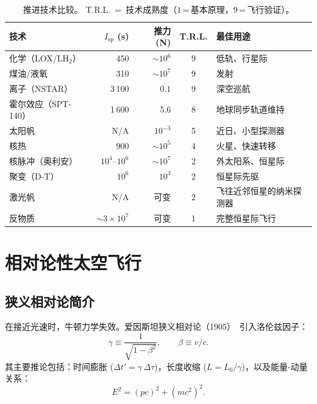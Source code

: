 \documentclass[12pt,a4paper]{article}
\begin{document}
\begin{table}[ht]
  \centering
  \caption{推进技术比较。
           T.R.L.~=~技术成熟度（$1$\,=\,基本原理，$9$\,=\,飞行验证）。}
  \label{tab:propulsion_zh}
  \begin{tabularx}{\textwidth}{l r r c X}
    \toprule
    技术 & $I_{\mathrm{sp}}$ (s) & 推力 (N) & T.R.L. & 最佳用途 \\
    \midrule
    化学（LOX/LH$_2$）   & 450            & $\sim\!10^6$ & 9 & 低轨、行星际 \\
    煤油/液氧            & 310            & $\sim\!10^7$ & 9 & 发射 \\
    离子（NSTAR）        & 3\,100         & $0.1$        & 9 & 深空巡航 \\
    霍尔效应（SPT-140）  & 1\,600         & 5.6          & 8 & 地球同步轨道维持 \\
    太阳帆               & N/A            & $10^{-3}$    & 5 & 近日、小型探测器 \\
    核热                 & 900            & $\sim\!10^5$ & 4 & 火星、快速转移 \\
    核脉冲（奥利安）     & $10^4$--$10^6$ & $\sim\!10^7$ & 2 & 外太阳系、恒星际 \\
    聚变（D-T）          & $10^6$         & $10^3$       & 2 & 恒星际先驱 \\
    激光帆               & N/A            & 可变         & 2 & 飞往近邻恒星的纳米探测器 \\
    反物质               & $\sim\!3\!\times\!10^7$ & 可变 & 1 & 完整恒星际飞行 \\
    \bottomrule
  \end{tabularx}
\end{table}

\section{相对论性太空飞行}

\subsection{狭义相对论简介}

在接近光速时，牛顿力学失效。爱因斯坦狭义相对论（1905）~\citep{Einstein1905}引入洛伦兹因子：
\begin{equation}
  \gamma \equiv \frac{1}{\sqrt{1-\beta^2}}, \qquad \beta \equiv v/c.
\end{equation}
其主要推论包括：时间膨胀 ($\Delta t' = \gamma\,\Delta\tau$)，长度收缩 ($L = L_0/\gamma$)，以及能量-动量关系：
\begin{equation}
  E^2 = (pc)^2 + (mc^2)^2.
\end{equation}
\end{document}
